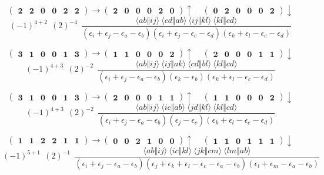 \documentclass[12pt,oneside,a4paper,fleqn]{article}
\begin{document}
\[ \boldsymbol{ \begin{pmatrix} 2 & 2 & 0 & 0 & 2 & 2 \end{pmatrix} \rightarrow \begin{pmatrix} 2 & 0 & 0 & 0 & 2 & 0 \end{pmatrix} \uparrow~~~~~\begin{pmatrix} 0 & 2 & 0 & 0 & 0 & 2 \end{pmatrix} \downarrow } \]
$$(-1)^{4+2}~~(2)^{-4}~~\frac{\langle ab \Vert ij \rangle ~\langle cd \Vert ab \rangle ~\langle ij \Vert kl \rangle ~\langle kl \Vert cd \rangle }{(\epsilon_i +\epsilon_j -\epsilon_a -\epsilon_b ) (\epsilon_i +\epsilon_j -\epsilon_c -\epsilon_d ) (\epsilon_k +\epsilon_l -\epsilon_c -\epsilon_d ) }$$

\[ \boldsymbol{ \begin{pmatrix} 3 & 1 & 0 & 0 & 1 & 3 \end{pmatrix} \rightarrow \begin{pmatrix} 1 & 1 & 0 & 0 & 0 & 2 \end{pmatrix} \uparrow~~~~~\begin{pmatrix} 2 & 0 & 0 & 0 & 1 & 1 \end{pmatrix} \downarrow } \]
$$(-1)^{4+3}~~(2)^{-2}~~\frac{\langle ab \Vert ij \rangle ~\langle ij \Vert ak \rangle ~\langle cd \Vert bl \rangle ~\langle kl \Vert cd \rangle }{(\epsilon_i +\epsilon_j -\epsilon_a -\epsilon_b ) (\epsilon_k -\epsilon_b ) (\epsilon_k +\epsilon_l -\epsilon_c -\epsilon_d ) }$$

\[ \boldsymbol{ \begin{pmatrix} 3 & 1 & 0 & 0 & 1 & 3 \end{pmatrix} \rightarrow \begin{pmatrix} 2 & 0 & 0 & 0 & 1 & 1 \end{pmatrix} \uparrow~~~~~\begin{pmatrix} 1 & 1 & 0 & 0 & 0 & 2 \end{pmatrix} \downarrow } \]
$$(-1)^{4+3}~~(2)^{-2}~~\frac{\langle ab \Vert ij \rangle ~\langle ic \Vert ab \rangle ~\langle jd \Vert kl \rangle ~\langle kl \Vert cd \rangle }{(\epsilon_i +\epsilon_j -\epsilon_a -\epsilon_b ) (\epsilon_j -\epsilon_c ) (\epsilon_k +\epsilon_l -\epsilon_c -\epsilon_d ) }$$

\[ \boldsymbol{ \begin{pmatrix} 1 & 1 & 2 & 2 & 1 & 1 \end{pmatrix} \rightarrow \begin{pmatrix} 0 & 0 & 2 & 1 & 0 & 0 \end{pmatrix} \uparrow~~~~~\begin{pmatrix} 1 & 1 & 0 & 1 & 1 & 1 \end{pmatrix} \downarrow } \]
$$(-1)^{5+1}~~(2)^{-1}~~\frac{\langle ab \Vert ij \rangle ~\langle ic \Vert kl \rangle ~\langle jk \Vert cm \rangle ~\langle lm \Vert ab \rangle }{(\epsilon_i +\epsilon_j -\epsilon_a -\epsilon_b ) (\epsilon_j +\epsilon_k +\epsilon_l -\epsilon_c -\epsilon_a -\epsilon_b ) (\epsilon_l +\epsilon_m -\epsilon_a -\epsilon_b ) }$$
\end{document}
